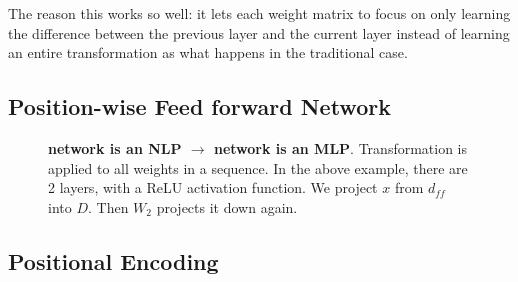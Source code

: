 \documentclass[11pt]{article}
\begin{document}
The reason this works so well: it lets each weight matrix to focus on only learning the difference between the previous layer and the current layer instead of learning an entire transformation as what happens in the traditional case.

\subsection{Position-wise Feed forward Network}

\begin{figure}[H]
    \centering
    \caption*{\textbf{network is an NLP $\rightarrow$ network is an MLP}. Transformation is applied to all weights in a sequence. In the above example, there are 2 layers, with a ReLU activation function. We project $x$ from $d_{ff}$ into $D$. Then $W_2$ projects it down again.}
\end{figure}

\subsection{Positional Encoding}
\end{document}
